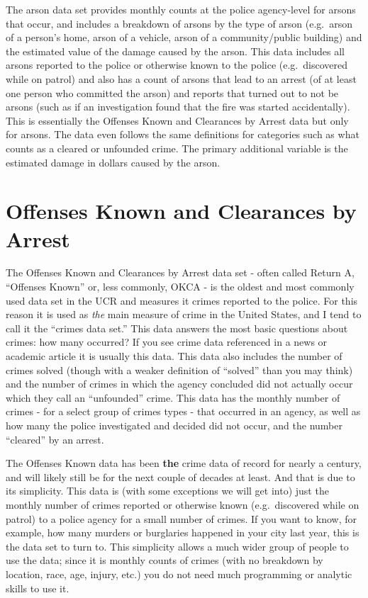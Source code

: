 \documentclass[
]{krantz}
\begin{document}
The arson data set provides monthly counts at the police
agency-level for arsons that occur, and includes a breakdown
of arsons by the type of arson (e.g.~arson of a person's
home, arson of a vehicle, arson of a community/public
building) and the estimated value of the damage caused by
the arson. This data includes all arsons reported to the
police or otherwise known to the police (e.g.~discovered
while on patrol) and also has a count of arsons that lead to
an arrest (of at least one person who committed the arson)
and reports that turned out to not be arsons (such as if an
investigation found that the fire was started accidentally).
This is essentially the Offenses Known and Clearances by
Arrest data but only for arsons. The data even follows the
same definitions for categories such as what counts as a
cleared or unfounded crime. The primary additional variable
is the estimated damage in dollars caused by the arson.

\chapter{Offenses Known and Clearances by
Arrest}\label{offensesKnown}

The Offenses Known and Clearances by Arrest data set - often
called Return A, ``Offenses Known'' or, less commonly, OKCA
- is the oldest and most commonly used data set in the UCR
and measures it crimes reported to the police. For this
reason it is used as \emph{the} main measure of crime in the
United States, and I tend to call it the ``crimes data set.''
This data answers the most basic questions about crimes: how
many occurred? If you see crime data referenced in a news or
academic article it is usually this data. This data also
includes the number of crimes solved (though with a weaker
definition of ``solved'' than you may think) and the number
of crimes in which the agency concluded did not actually
occur which they call an ``unfounded'' crime. This data has
the monthly number of crimes - for a select group of crimes
types - that occurred in an agency, as well as how many the
police investigated and decided did not occur, and the
number ``cleared'' by an arrest.

The Offenses Known data has been \textbf{the} crime data of
record for nearly a century, and will likely still be for
the next couple of decades at least. And that is due to its
simplicity. This data is (with some exceptions we will get
into) just the monthly number of crimes reported or
otherwise known (e.g.~discovered while on patrol) to a
police agency for a small number of crimes. If you want to
know, for example, how many murders or burglaries happened
in your city last year, this is the data set to turn to. This
simplicity allows a much wider group of people to use the
data; since it is monthly counts of crimes (with no
breakdown by location, race, age, injury, etc.) you do not
need much programming or analytic skills to use it.
\end{document}
